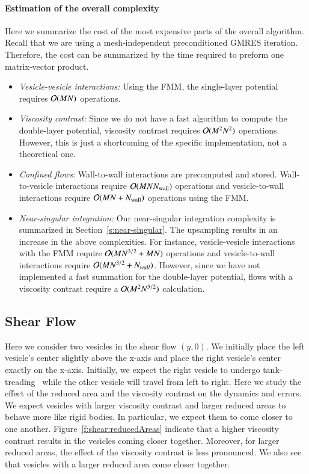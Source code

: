 \paragraph{Estimation of the overall complexity}
Here we summarize the cost of the most expensive parts of the overall
algorithm.  Recall that we are using a mesh-independent preconditioned
GMRES iteration.  Therefore, the cost can be summarized by the time
required to preform one matrix-vector product.
\begin{itemize}
  \item{\em {Vesicle-vesicle interactions:}}
    Using the FMM, the single-layer potential requires $\mathcal{O}(MN)$
    operations. 

  \item{\em {Viscosity contrast:}}
    Since we do not have a fast algorithm to compute the double-layer
    potential, viscosity contrast requires $\mathcal{O}(M^{2}N^{2})$
    operations.  However, this is just a shortcoming of the specific
    implementation, not a theoretical one.

  \item{\em {Confined flows:}}
    Wall-to-wall interactions are precomputed and stored.
    Wall-to-vesicle interactions require $\mathcal{O}(MNN_{\mathrm{wall}})$
    operations and vesicle-to-wall interactions require
    $\mathcal{O}(MN+N_{\mathrm{wall}})$ operations using the FMM.

  \item{\em {Near-singular integration:}}
    Our near-singular integration complexity is summarized in
    Section~\ref{s:near-singular}.  The upsampling results in an
    increase in the above complexities.  For instance, vesicle-vesicle
    interactions with the FMM require $\mathcal{O}(MN^{3/2}+MN)$ operations
    and vesicle-to-wall interactions require
    $\mathcal{O}(MN^{3/2}+N_{wall})$.  However, since we have not implemented
    a fast summation for the double-layer potential, flows with a
    viscosity contrast require a $\mathcal{O}(M^{2}N^{5/2})$ calculation.
\end{itemize}

\subsection{Shear Flow}
Here we consider two vesicles in the shear flow $(y,0)$.  We initially
place the left vesicle's center slightly above the x-axis and place the
right vesicle's center exactly on the x-axis.  Initially, we expect the
right vesicle to undergo tank-treading~\cite{kantsler,misbah2006} while
the other vesicle will travel from left to right.  Here we study the
effect of the reduced area and the viscosity contrast on the dynamics
and errors.  We expect vesicles with larger viscosity contrast and
larger reduced areas to behave more like rigid bodies.  In particular,
we expect them to come closer to one another.
Figure~\ref{f:shear:reducedAreas} indicate that a higher viscosity
contrast results in the vesicles coming closer together.  Moreover, for
larger reduced areas, the effect of the viscosity contrast is less
pronounced.  We also see that vesicles with a larger reduced area come
closer together.

